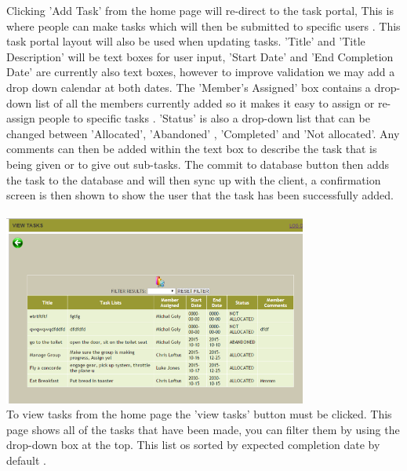 \documentclass{project}
\begin{document}
Clicking 'Add Task' from the home page will re-direct to the task portal, This is where people can make tasks which will then be submitted to specific users \cite{se.qa.rs fr4}. This task portal layout will also be used when updating tasks. 'Title' and 'Title Description' will be text boxes for user input, 'Start Date' and 'End Completion Date' are currently also text boxes, however to improve validation we may add a drop down calendar at both dates. The 'Member's Assigned' box contains a drop-down list of all the members currently added so it makes it easy to assign or re-assign people to specific tasks \cite{se.qa.rs fr5}. 'Status' is also a drop-down list that can be changed between 'Allocated', 'Abandoned' \cite{se.qa.rs fr6}, 'Completed' and 'Not allocated'. Any comments can then be added within the text box to describe the task that is being given or to give out sub-tasks. The commit to database button then adds the task to the database and will then sync up with the client, a confirmation screen is then shown to show the user that the task has been successfully added. \\~\\
\newline
\includegraphics[width=0.75\textwidth, center]{images/5.2/TaskerMANViewTask} \\
To view tasks from the home page the 'view tasks' button must be clicked. This page shows all of the tasks that have been made, you can filter them by using the drop-down box at the top. This list os sorted by expected completion date by default \cite{se.qa.rs fr7}.
\end{document}
